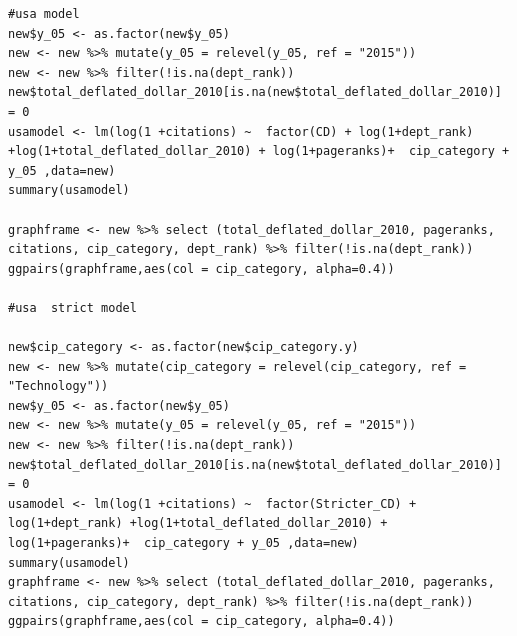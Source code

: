 \documentclass[a4paper,11pt]{article}
\theoremstyle{mytheor}
\begin{document}
\begin{lstlisting}
#usa model
new$y_05 <- as.factor(new$y_05)
new <- new %>% mutate(y_05 = relevel(y_05, ref = "2015"))
new <- new %>% filter(!is.na(dept_rank))
new$total_deflated_dollar_2010[is.na(new$total_deflated_dollar_2010)] = 0
usamodel <- lm(log(1 +citations) ~  factor(CD) + log(1+dept_rank) +log(1+total_deflated_dollar_2010) + log(1+pageranks)+  cip_category + y_05 ,data=new)
summary(usamodel)

graphframe <- new %>% select (total_deflated_dollar_2010, pageranks, citations, cip_category, dept_rank) %>% filter(!is.na(dept_rank))
ggpairs(graphframe,aes(col = cip_category, alpha=0.4))

#usa  strict model 

new$cip_category <- as.factor(new$cip_category.y)
new <- new %>% mutate(cip_category = relevel(cip_category, ref = "Technology"))
new$y_05 <- as.factor(new$y_05)
new <- new %>% mutate(y_05 = relevel(y_05, ref = "2015"))
new <- new %>% filter(!is.na(dept_rank))
new$total_deflated_dollar_2010[is.na(new$total_deflated_dollar_2010)] = 0
usamodel <- lm(log(1 +citations) ~  factor(Stricter_CD) + log(1+dept_rank) +log(1+total_deflated_dollar_2010) + log(1+pageranks)+  cip_category + y_05 ,data=new)
summary(usamodel)
graphframe <- new %>% select (total_deflated_dollar_2010, pageranks, citations, cip_category, dept_rank) %>% filter(!is.na(dept_rank))
ggpairs(graphframe,aes(col = cip_category, alpha=0.4))

\end{lstlisting} 

\newpage
\end{document}
